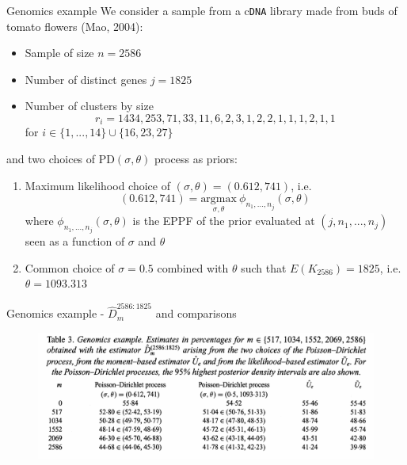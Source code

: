 \documentclass[11pt]{beamer}
\newcommand\Fontvii{\fontsize{9}{10}\selectfont}
\begin{document}
\begin{frame}{Genomics example}
    \Fontvii
    We consider a sample from a c\texttt{DNA} library made from buds of tomato flowers (Mao, 2004):
    \begin{itemize}
        \item Sample of size \(n = 2586\)
        \item Number of distinct genes \(j = 1825\)
        \item Number of clusters by size 
        \begin{equation*}
            r_i = 1434, 253, 71, 33, 11, 6, 2, 3, 1, 2, 2, 1, 1, 1, 2, 1, 1
        \end{equation*}
        for \(i \in \{1,...,14\}\cup\{16,23,27\}\)
    \end{itemize}
    \medskip
    
    and two choices of \(\text{PD}(\sigma, \theta)\) process as priors:
    \begin{enumerate}
        \item Maximum likelihood choice of \((\sigma, \theta) = (0.612, 741)\), i.e.
        \begin{equation*}
            (0.612, 741) = \underset{\sigma, \theta}{\text{argmax}}\ \phi_{n_1,...,n_j}(\sigma, \theta)
        \end{equation*}
        where \(\phi_{n_1,...,n_j}(\sigma, \theta)\) is the EPPF of the prior evaluated at \((j, n_1,...,n_j)\) seen as a function of \(\sigma\) and \(\theta\)
        \item Common choice of \(\sigma = 0.5\) combined with \(\theta\) such that \(E(K_{2586}) = 1825\), i.e. \(\theta = 1093.313\)
    \end{enumerate}
\end{frame}

\begin{frame}{Genomics example - \(\hat{D}_m^{2586:1825}\) and comparisons}
    \begin{figure}
        \includegraphics[scale=0.35]{./img/lijoi07_genomics_table.png}
        \label{fig:genomics_1}
    \end{figure}
\end{frame}
\end{document}
